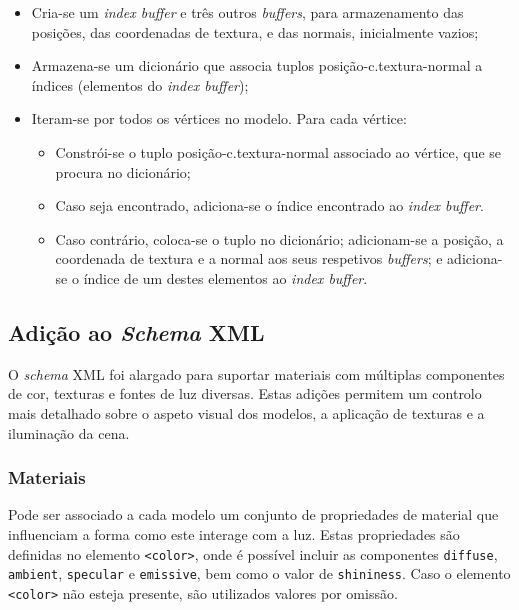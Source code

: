 \documentclass[12pt, a4paper]{article}
\begin{document}
\begin{itemize}
    \item Cria-se um \emph{index buffer} e três outros \emph{buffers}, para armazenamento das
        posições, das coordenadas de textura, e das normais, inicialmente vazios;

    \item Armazena-se um dicionário que associa tuplos posição-c.textura-normal a índices (elementos
        do \emph{index buffer});

    \item Iteram-se por todos os vértices no modelo. Para cada vértice:
        \begin{itemize}
            \item Constrói-se o tuplo posição-c.textura-normal associado ao vértice, que se procura
                no dicionário;
            \item Caso seja encontrado, adiciona-se o índice encontrado ao \emph{index buffer}.
            \item Caso contrário, coloca-se o tuplo no dicionário; adicionam-se a posição, a
                coordenada de textura e a normal aos seus respetivos \emph{buffers}; e adiciona-se o
                índice de um destes elementos ao \emph{index buffer}.
        \end{itemize}
\end{itemize}

\subsection{Adição ao \emph{Schema} XML}

O \emph{schema} XML foi alargado para suportar materiais com múltiplas componentes de cor, texturas
e fontes de luz diversas. Estas adições permitem um controlo mais detalhado sobre o aspeto visual
dos modelos, a aplicação de texturas e a iluminação da cena.

\subsubsection{Materiais}

Pode ser associado a cada modelo um conjunto de propriedades de material que influenciam a forma
como este interage com a luz. Estas propriedades são definidas no elemento \texttt{<color>}, onde é
possível incluir as componentes \texttt{diffuse}, \texttt{ambient}, \texttt{specular} e
\texttt{emissive}, bem como o valor de \texttt{shininess}. Caso o elemento \texttt{<color>} não
esteja presente, são utilizados valores por omissão.
\end{document}
